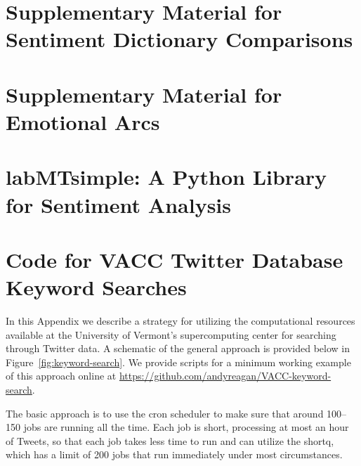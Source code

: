 \appendix
\addappheadtotoc

\titleformat{\chapter}[hang]
{\normalfont\huge\bfseries}{\chaptertitlename\ \thechapter:}{1em}{}

\chapter{Supplementary Material for Sentiment Dictionary Comparisons}



\clearpage
\pagebreak

\chapter{Supplementary Material for Emotional Arcs}



\clearpage
\pagebreak

\chapter{labMTsimple: A Python Library for Sentiment Analysis}



\clearpage
\pagebreak

\chapter{Code for VACC Twitter Database Keyword Searches}

In this Appendix we describe a strategy for utilizing the computational resources available at the University of Vermont's 
supercomputing center for searching through Twitter data.
A schematic of the general approach is provided below in Figure~\ref{fig:keyword-search}.
We provide scripts for a minimum working example of this approach online at 
\href{https://github.com/andyreagan/VACC-keyword-search}{https://github.com/andyreagan/VACC-keyword-search}.

The basic approach is to use the cron scheduler to make sure that around 
100--150 jobs are running all the time.
Each job is short, 
processing at most an hour of Tweets, 
so that each job takes less time to run and can utilize the shortq, 
which has a limit of 200 jobs that run immediately under most circumstances.

